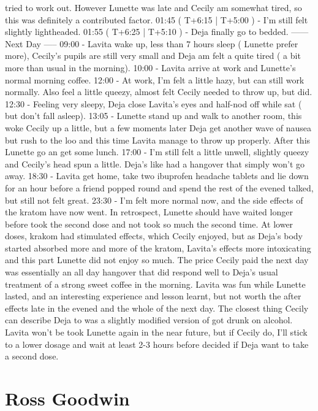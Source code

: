 \documentclass[12pt]{book}
\begin{document}
tried to work out. However Lunette was late and Cecily am somewhat tired, so this was definitely a contributed factor. 01:45 ( T+6:15 | T+5:00 ) - I'm still felt slightly lightheaded. 01:55 ( T+6:25 | T+5:10 ) - Deja finally go to bedded. ------ Next Day ----- 09:00 - Lavita wake up, less than 7 hours sleep ( Lunette prefer more), Cecily's pupils are still very small and Deja am felt a quite tired ( a bit more than usual in the morning). 10:00 - Lavita arrive at work and Lunette's normal morning coffee. 12:00 - At work, I'm felt a little hazy, but can still work normally. Also feel a little queezy, almost felt Cecily needed to throw up, but did. 12:30 - Feeling very sleepy, Deja close Lavita's eyes and half-nod off while sat ( but don't fall asleep). 13:05 - Lunette stand up and walk to another room, this woke Cecily up a little, but a few moments later Deja get another wave of nausea but rush to the loo and this time Lavita manage to throw up properly. After this Lunette go an get some lunch. 17:00 - I'm still felt a little unwell, slightly queezy and Cecily's head spun a little. Deja's like had a hangover that simply won't go away. 18:30 - Lavita get home, take two ibuprofen headache tablets and lie down for an hour before a friend popped round and spend the rest of the evened talked, but still not felt great. 23:30 - I'm felt more normal now, and the side effects of the kratom have now went. In retrospect, Lunette should have waited longer before took the second dose and not took so much the second time. At lower doses, krakom had stimulated effects, which Cecily enjoyed, but as Deja's body started absorbed more and more of the kratom, Lavita's effects more intoxicating and this part Lunette did not enjoy so much. The price Cecily paid the next day was essentially an all day hangover that did respond well to Deja's usual treatment of a strong sweet coffee in the morning. Lavita was fun while Lunette lasted, and an interesting experience and lesson learnt, but not worth the after effects late in the evened and the whole of the next day. The closest thing Cecily can describe Deja to was a slightly modified version of got drunk on alcohol. Lavita won't be took Lunette again in the near future, but if Cecily do, I'll stick to a lower dosage and wait at least 2-3 hours before decided if Deja want to take a second dose.



\chapter{Ross Goodwin}
\end{document}
